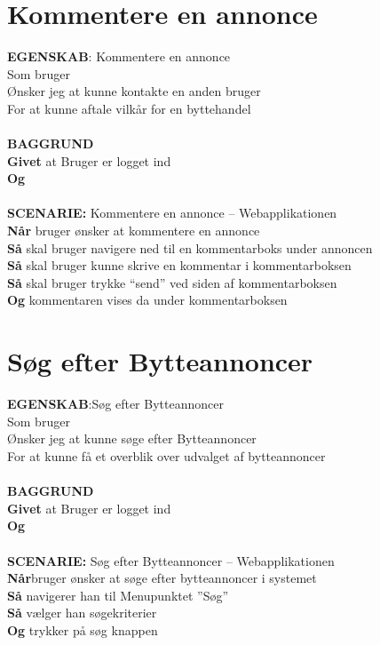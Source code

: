 \section{Kommentere en annonce}
{\color{blue}\textbf{EGENSKAB}:} Kommentere en annonce \\
Som bruger \\
Ønsker jeg at kunne kontakte en anden bruger \\
For at kunne aftale vilkår for en byttehandel\\ \\
{\color{blue}\textbf{BAGGRUND}} \\
{\color{blue}\textbf{Givet}} at Bruger er logget ind \\
{\color{blue}\textbf{Og}} \\\\
{\color{blue}\textbf{SCENARIE:}} Kommentere en annonce – Webapplikationen \\
{\color{blue}\textbf{Når}} bruger ønsker at kommentere en annonce
 \\
{\color{blue}\textbf{Så}} skal bruger navigere ned til en kommentarboks under annoncen \\
{\color{blue}\textbf{Så}} skal bruger kunne skrive en kommentar i kommentarboksen\\
{\color{blue}\textbf{Så}} skal bruger trykke “send” ved siden af kommentarboksen \\
{\color{blue}\textbf{Og}} kommentaren vises da under kommentarboksen


\section{Søg efter Bytteannoncer}
{\color{blue}\textbf{EGENSKAB}:}Søg efter Bytteannoncer \\
Som bruger \\
Ønsker jeg at kunne søge efter Bytteannoncer \\
For at kunne få et overblik over udvalget af bytteannoncer\\ \\
{\color{blue}\textbf{BAGGRUND}} \\
{\color{blue}\textbf{Givet}} at Bruger er logget ind \\
{\color{blue}\textbf{Og}} \\\\
{\color{blue}\textbf{SCENARIE:}} Søg efter Bytteannoncer – Webapplikationen \\
{\color{blue}\textbf{Når}}bruger ønsker at søge efter bytteannoncer i systemet\\
{\color{blue}\textbf{Så}} navigerer han til Menupunktet ”Søg” \\
{\color{blue}\textbf{Så}} vælger han søgekriterier\\
{\color{blue}\textbf{Og}} trykker på søg knappen

